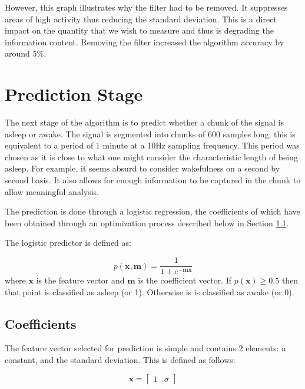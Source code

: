             However, this graph illustrates why the filter had to be removed. It suppresses areas of high activity thus reducing the standard deviation. This is a direct impact on the quantity that we wish to measure and thus is degrading the information content. Removing the filter increased the algorithm accuracy by around 5\%.           

        \section{Prediction Stage}

            The next stage of the algorithm is to predict whether a chunk of the signal is asleep or awake. The signal is segmented into chunks of 600 samples long, this is equivalent to a period of 1 minute at a 10Hz sampling frequency. This period was chosen as it is close to what one might consider the characteristic length of being asleep. For example, it seems absurd to consider wakefulness on a second by second basis. It also allows for enough information to be captured in the chunk to allow meaningful analysis.

            The prediction is done through a logistic regression, the coefficients of which have been obtained through an optimization process described below in Section \ref{ss_coefficients}.

            The logistic predictor is defined as:

            \begin{equation}
                p(\mathbf{x}, \mathbf{m}) = \frac{1}{1 + e^{-\mathbf{mx}}}
            \end{equation}
            where $\mathbf{x}$ is the feature vector and $\mathbf{m}$ is the coefficient vector. If $p(\mathbf{x}) \geq 0.5$ then that point is classified as asleep (or 1). Otherwise is is classified as awake (or 0).

            \subsection{Coefficients}
                \label{ss_coefficients}

                The feature vector selected for prediction is simple and contains 2 elements: a constant, and the standard deviation. This is defined as follows: 

                \begin{equation}
                    \mathbf{x} = \begin{bmatrix} 1 & \sigma \end{bmatrix}
                \end{equation}

